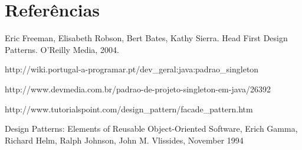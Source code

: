 \section{Referências}

\begin{thebibliography}{99} %

Eric Freeman, Elisabeth Robson, Bert Bates, Kathy Sierra. Head First Design Patterns. O'Reilly Media, 2004.

http://wiki.portugal-a-programar.pt/dev\_geral:java:padrao\_singleton

http://www.devmedia.com.br/padrao-de-projeto-singleton-em-java/26392

http://www.tutorialspoint.com/design\_pattern/facade\_pattern.htm

Design Patterns: Elements of Reusable Object-Oriented Software, Erich Gamma, Richard Helm, Ralph Johnson, John M. Vlissides, November 1994

\end{thebibliography}
